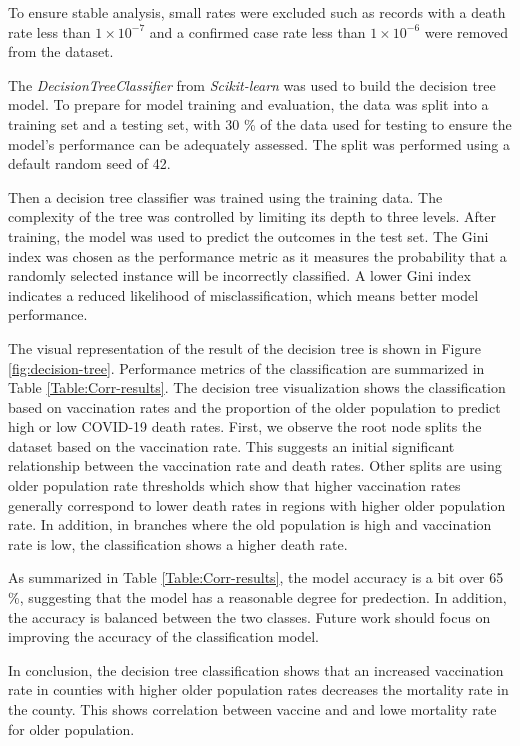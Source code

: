 \documentclass[sigconf,screen,nonacm]{acmart}
\begin{document}
To ensure stable analysis, small rates were excluded such as records with a death rate less than $1 \times 10^{-7}$ and a confirmed case rate less than $1 \times 10^{-6}$ were removed from the dataset.


The \textit{DecisionTreeClassifier} from \textit{Scikit-learn} was used to build the decision tree model. To prepare for model training and evaluation, the data was split into a training set and a testing set, with 30 \% of the data used for testing to ensure the model's performance can be adequately assessed. The split was performed using a default random seed of 42.

Then a decision tree classifier was trained using the training data. The complexity of the tree was controlled by limiting its depth to three levels. After training, the model was used to predict the outcomes in the test set. The Gini index was chosen as the performance metric as it measures the probability that a randomly selected instance will be incorrectly classified. A lower Gini index indicates a reduced likelihood of misclassification, which means better model performance.

The visual representation of the result of the decision tree is shown in Figure \ref{fig:decision-tree}. Performance metrics of the classification are summarized in Table \ref{Table:Corr-results}. The decision tree visualization shows the classification based on vaccination rates and the proportion of the older population to predict high or low COVID-19 death rates. First, we observe the root node splits the dataset based on the vaccination rate. This suggests an initial significant relationship between the vaccination rate and death rates. Other splits are using older population rate thresholds which show that higher vaccination rates generally correspond to lower death rates in regions with higher older population rate. In addition, in branches where the old population is high and vaccination rate is low, the classification shows a higher death rate.

As summarized in Table \ref{Table:Corr-results}, the model accuracy is a bit over 65 \%, suggesting that the model has a reasonable degree for predection. In addition, the accuracy is balanced between the two classes. Future work should focus on improving the accuracy of the classification model.

In conclusion, the decision tree classification shows that an increased vaccination rate in counties with higher older population rates decreases the mortality rate in the county. This shows correlation between vaccine and and lowe mortality rate for older population. 
\end{document}
